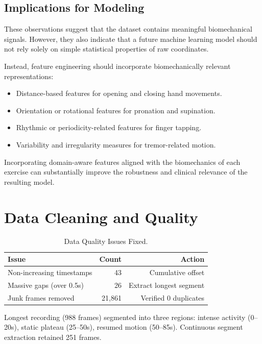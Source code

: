 \documentclass[11pt,twocolumn]{article}
\begin{document}
\subsection{Implications for Modeling}

These observations suggest that the dataset contains meaningful biomechanical signals. However, they also indicate that a future machine learning model should not rely solely on simple statistical properties of raw coordinates.

Instead, feature engineering should incorporate biomechanically relevant representations:

\begin{itemize}
    \item Distance-based features for opening and closing hand movements.
    \item Orientation or rotational features for pronation and supination.
    \item Rhythmic or periodicity-related features for finger tapping.
    \item Variability and irregularity measures for tremor-related motion.
\end{itemize}

Incorporating domain-aware features aligned with the biomechanics of each exercise can substantially improve the robustness and clinical relevance of the resulting model.
\section{Data Cleaning and Quality}

\begin{table}[H]
\small
\centering
\setlength{\tabcolsep}{3pt}
\begin{tabular}{lrr}
\toprule
\textbf{Issue} & \textbf{Count} & \textbf{Action} \\
\midrule
Non-increasing timestamps & 43 & Cumulative offset \\
Massive gaps (over 0.5s) & 26 & Extract longest segment \\
Junk frames removed & 21,861 & Verified 0 duplicates \\
\bottomrule
\end{tabular}
\caption{\small Data Quality Issues Fixed.}
\end{table}

Longest recording (988 frames) segmented into three regions: intense activity (0--20s), static plateau (25--50s), resumed motion (50--85s). Continuous segment extraction retained 251 frames.
\end{document}
